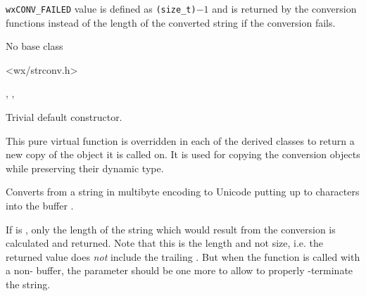 
\texttt{wxCONV\_FAILED} value is defined as \texttt{(size\_t)$-1$} and is
returned by the conversion functions instead of the length of the converted
string if the conversion fails.



No base class


<wx/strconv.h>




, 
, 




\label{wxmbconvwxmbconv}


Trivial default constructor.


\label{wxmbconvclone}


This pure virtual function is overridden in each of the derived classes to
return a new copy of the object it is called on. It is used for copying the
conversion objects while preserving their dynamic type.


\label{wxmbconvmb2wc}



Converts from a string  in multibyte encoding to Unicode putting up to 
 characters into the buffer .

If  is \NULL, only the length of the string which would result from
the conversion is calculated and returned. Note that this is the length and not
size, i.e. the returned value does \emph{not} include the trailing \NUL. But
when the function is called with a non-\NULL {} buffer, the  
parameter should be one more to allow to properly \NUL-terminate the string.



